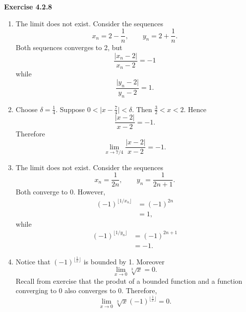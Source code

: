 \documentclass[12pt]{article}
\begin{document}
\textbf{Exercise 4.2.8}
\begin{enumerate}[label=(\alph*)]
    \item The limit does not exist. Consider the sequences
          \[
              x_n = 2 - \frac{1}{n}, \qquad y_n = 2 + \frac{1}{n}.
          \]
          Both sequences converges to 2, but
          \[
              \frac{\vert x_n - 2 \vert }{x_n - 2} = -1
          \]
          while
          \[
              \frac{\vert y_n - 2 \vert }{y_n - 2} = 1.
          \]

    \item Choose \( \delta = \frac{1}{4} \). Suppose \( 0 < \vert x - \frac{7}{4} \vert < \delta \). Then \( \frac{3}{2} < x < 2 \). Hence
          \[
              \frac{\vert x - 2 \vert }{x - 2} = -1.
          \]
          Therefore
          \[
              \lim_{x\to7/4}\frac{|x-2|}{x-2}=-1.
          \]

    \item The limit does not exist. Consider the sequences
          \[
              x_n=\frac1{2n},\qquad y_n=\frac1{2n+1}.
          \]
          Both converge to \(0\). However,
          \[
              \begin{aligned}
                  (-1)^{\lfloor1/x_n\rfloor}
                   & =(-1)^{2n} \\
                   & =1,
              \end{aligned}
          \]
          while
          \[
              \begin{aligned}
                  (-1)^{\lfloor1/y_n\rfloor}
                   & =(-1)^{2n+1} \\
                   & =-1.
              \end{aligned}
          \]

    \item Notice that \( (-1)^{\lfloor \frac{1}{x} \rfloor} \) is bounded by 1. Moreover
          \[
              \lim_{x \to 0} \sqrt[3]{x} = 0.
          \]
          Recall from exercise that the produt of a bounded function and a function converging to 0 also converges to 0. Therefore,
          \[
              \lim_{x \to 0} \sqrt[3]{x} (-1)^{\lfloor \frac{1}{x} \rfloor} = 0.
          \]

\end{enumerate}
\end{document}
